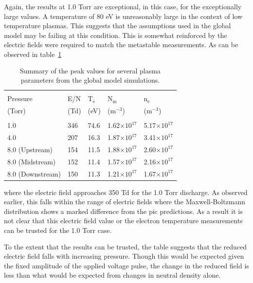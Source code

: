 Again, the results at 1.0 Torr are exceptional, in this case, for the
exceptionally large values. A temperature of 80 eV is unreasonably large in the
context of low temperature plasmas. This suggests that the assumptions used in
the global model may be failing at this condition. This is somewhat reinforced
by the electric fields were required to match the metastable measurements. As
can be observed in table~\ref{tbl:simsum}
\begin{table}
  \centering
  \caption{Summary of the peak values for several plasma parameters from the
  global model simulations.}
  \begin{tabular}{lllll}
    \toprule \\
    Pressure         & E/N  & T$_\mathrm{e}$ & N$_\mathrm{m}$ & n$_\mathrm{e}$ \\
    (Torr)           & (Td) & (eV)           &  (m$^{-3}$)    & (m$^{-3}$) \\
    \midrule \\
    1.0              & 346  & 74.6           & 1.62$\times10^{17}$ & 
      5.17$\times10^{17}$ \\
    4.0              & 207  & 16.3           & 1.87$\times10^{17}$ &
      3.41$\times10^{17}$ \\
    8.0 (Upstream)   & 154  & 11.5           & 1.88$\times10^{17}$ &
      2.60$\times10^{17}$ \\
    8.0 (Midstream)  & 152  & 11.4           & 1.57$\times10^{17}$ & 
      2.16$\times10^{17}$ \\
    8.0 (Downstream) & 150  & 11.3           & 1.21$\times10^{17}$ &
      1.67$\times10^{17}$ \\
    \bottomrule
  \end{tabular}
  \label{tbl:simsum}
\end{table}
where the electric field approaches 350 Td for the 1.0 Torr discharge. As
observed earlier, this falls within the range of electric fields where the
Maxwell-Boltzmann distribution shows a marked difference from the \acs{pic}
predictions. As a result it is not clear that this electric field value or the
electron temperature measurements can be trusted for the 1.0 Torr case. 

To the extent that the results can be trusted, the table suggests that the
reduced electric field falls with increasing pressure. Though this would be
expected given the fixed amplitude of the applied voltage pulse, the change in
the reduced field is less than what would be expected from changes in neutral
density alone. 

